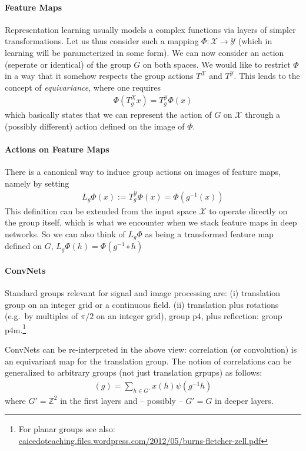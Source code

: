 \documentclass{article}
\newcommand{\ZZ}{{\mathbb Z}}
\newcommand{\X}{{\mathcal X}}
\newcommand{\Y}{{\mathcal Y}}
\begin{document}
\paragraph{Feature Maps} Representation learning usually models a complex functions via layers of simpler transformations. Let us thus consider such a mapping $\Phi: \X \to \Y$ (which in learning will be parameterized in some form). We can now consider an action (seperate or identical) of the group $G$ on both spaces. We would like to restrict $\Phi$ in a way that it somehow respects the group actions $T^\X$ and $T^\Y$. This leads to the concept of \textit{equivariance}, where one requires 
\begin{align}
\Phi(T^X_g x) = T^\Y_g \Phi(x) 
\end{align}
which basically states that we can represent the action of $G$ on $\X$ through a (possibly different) action defined on the image of $\Phi$. 

\paragraph{Actions on Feature Maps}
There is a canonical way to induce group actions on images of feature maps, namely by setting 
\begin{align}
L_g \Phi(x) := T^\Y_g \Phi(x) = \Phi \left( g^{-1}(x)\right) 
\end{align}
This definition can be extended from the input space $\X$ to operate directly on the group itself, which is what we encounter when we stack feature maps in deep networks. So we can also think of $L_g \Phi$ as being a transformed feature map defined on $G$, $L_g \Phi(h) = \Phi\left(g^{-1} \circ h \right)$



\paragraph{ConvNets}

Standard groups relevant for signal and image processing are: (i) translation group on an integer grid or a continuous field. (ii) translation plus rotations (e.g.~by multiples of $\pi/2$  on an integer grid), group p4, plus reflection: group p4m.\footnote{For planar groups see also: \\\url{caicedoteaching.files.wordpress.com/2012/05/burns-fletcher-zell.pdf}}

ConvNets can be re-interpreted in the above view: correlation (or convolution) is an equivariant map for the translation group. The notion of correlations can be generalized to arbitrary groups (not just translation grpups) as follows: 
\begin{align}
[x \star \psi](g) = \sum_{h \in G'} x(h) \psi(g^{-1} h)
\end{align}
where $G' = \ZZ^2$ in the first layers and -- possibly -- $G'=G$ in deeper layers. 
\end{document}
